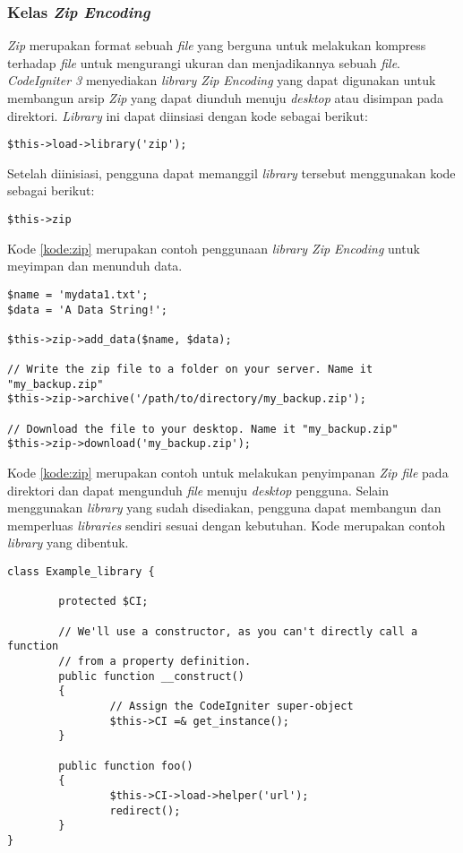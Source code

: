 \subsubsection{Kelas \textit{Zip Encoding}}
\textit{Zip} merupakan format sebuah \textit{file} yang berguna untuk melakukan kompress terhadap \textit{file} untuk mengurangi ukuran dan menjadikannya sebuah \textit{file}. \textit{CodeIgniter 3} menyediakan \textit{library Zip Encoding} yang dapat digunakan untuk membangun arsip \textit{Zip} yang dapat diunduh menuju \textit{desktop} atau disimpan pada direktori. \textit{Library} ini dapat diinsiasi dengan kode sebagai berikut:

\begin{center}
\verb|$this->load->library('zip');|
\end{center}

Setelah diinisiasi, pengguna dapat memanggil \textit{library} tersebut menggunakan kode sebagai berikut:

\begin{center}
\verb|$this->zip|
\end{center}

Kode \ref{kode:zip} merupakan contoh penggunaan \textit{library Zip Encoding} untuk meyimpan dan menunduh data.

\begin{lstlisting}[caption=Contoh penggunaan \textit{library Zip Encoding}, label=kode:zip]
$name = 'mydata1.txt';
$data = 'A Data String!';

$this->zip->add_data($name, $data);

// Write the zip file to a folder on your server. Name it "my_backup.zip"
$this->zip->archive('/path/to/directory/my_backup.zip');

// Download the file to your desktop. Name it "my_backup.zip"
$this->zip->download('my_backup.zip');
\end{lstlisting}

Kode \ref{kode:zip} merupakan contoh untuk melakukan penyimpanan \textit{Zip file} pada direktori dan dapat mengunduh \textit{file} menuju \textit{desktop} pengguna. Selain menggunakan \textit{library} yang sudah disediakan, pengguna dapat membangun dan memperluas \textit{libraries} sendiri sesuai dengan kebutuhan. Kode merupakan contoh \textit{library} yang dibentuk.

\begin{lstlisting}[caption=Contoh \textit{library} yang dibentuk, label=kode:newlib]
class Example_library {

        protected $CI;

        // We'll use a constructor, as you can't directly call a function
        // from a property definition.
        public function __construct()
        {
                // Assign the CodeIgniter super-object
                $this->CI =& get_instance();
        }

        public function foo()
        {
                $this->CI->load->helper('url');
                redirect();
        }
}
\end{lstlisting}

